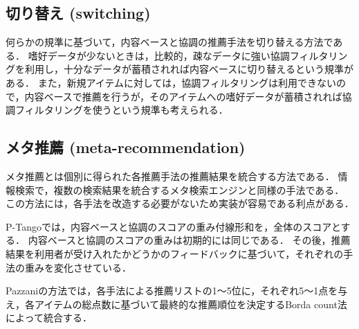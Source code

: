 
\subsection{切り替え (switching)}

何らかの規準に基づいて，内容ベースと協調の推薦手法を切り替える方法である．
嗜好データが少ないときは，比較的，疎なデータに強い協調フィルタリングを利用し，十分なデータが蓄積されれば内容ベースに切り替えるという規準がある．
また，新規アイテムに対しては，協調フィルタリングは利用できないので，内容ベースで推薦を行うが，そのアイテムへの嗜好データが蓄積されれば協調フィルタリングを使うという規準も考えられる．



\subsection{メタ推薦 (meta-recommendation)}

メタ推薦とは個別に得られた各推薦手法の推薦結果を統合する方法である．
情報検索で，複数の検索結果を統合するメタ検索エンジン\cite{www:01:01}と同様の手法である．
この方法には，各手法を改造する必要がないため実装が容易である利点がある．

P-Tango\cite{misc:092}では，内容ベースと協調のスコアの重み付線形和を，全体のスコアとする．
内容ベースと協調のスコアの重みは初期的には同じである．
その後，推薦結果を利用者が受け入れたかどうかのフィードバックに基づいて，それぞれの手法の重みを変化させている．

Pazzaniの方法\cite{ej:050}では，各手法による推薦リストの1〜5位に，それぞれ5〜1点を与え，各アイテムの総点数に基づいて最終的な推薦順位を決定するBorda count法\cite{eb:042:05}によって統合する．

